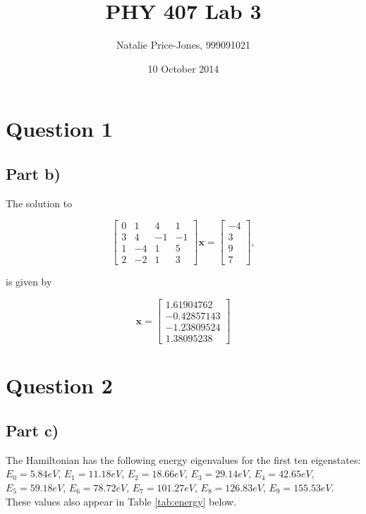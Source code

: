 \documentclass[a4paper,12pt]{article}
\begin{document}
\onehalfspacing
\title{PHY 407 Lab 3}
\author{Natalie Price-Jones, 999091021}
\date{10 October 2014}
\maketitle

\section{Question 1}

\subsection{Part b)}

The solution to

\[
\left[ \begin{array}{cccc}
0 & 1 & 4 & 1\\
3 & 4 & -1 & -1\\
1 & -4 & 1 & 5\\
2 & -2 & 1 & 3
\end{array} \right]
\mathbf{x} = 
\left[ \begin{array}{c}
-4 \\ 3 \\ 9 \\ 7
\end{array}\right],
\]

is given by 

\[
\mathbf{x} = \left[ \begin{array}{c}
 1.61904762 \\ -0.42857143 \\ -1.23809524 \\ 1.38095238
\end{array}\right]
\]

\section{Question 2}

\subsection{Part c)}

The Hamiltonian has the following energy eigenvalues for the first ten eigenstates: $E_0 = 5.84 eV$, $E_1 = 11.18eV$, $E_2 = 18.66 eV$, $E_3 = 29.14 eV$, $E_4 = 42.65 eV$, $E_5 = 59.18 eV$, $E_6 = 78.72 eV$, $E_7 = 101.27 eV$, $E_8 =   126.83 eV$, $E_9 = 155.53 eV$. These values also appear in Table \ref{tab:energy} below.
\end{document}
